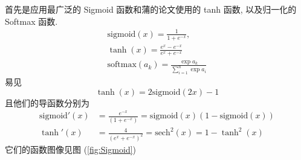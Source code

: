 \documentclass[lang=cn,a4paper,newtx]{elegantpaper}
\newcommand{\sech}{\text{sech}}
\begin{document}
首先是应用最广泛的 Sigmoid 函数和蒲的论文使用的 tanh 函数, 以及归一化的 Softmax 函数. 
\begin{equation}
    \begin{aligned}
        \text{sigmoid}(x) = \frac{1}{1+e^{-x}}, \\ 
        \tanh{(x)} = \frac{e^{x} - e^{-x}}{e^{x} + e^{-x}} \\
        \text{softmax}(a_k) = \frac{\exp a_k}{\sum_{i=1}^{n} \exp a_i}
    \end{aligned}
\end{equation} 
易见 
\begin{equation}
    \tanh(x) = 2 \text{sigmoid}(2x) - 1
\end{equation}
且他们的导函数分别为
\begin{align}\label{loss-example}
    \text{sigmoid}'(x) &= \frac{e^{-x}}{(1+e^{-x})} = \text{sigmoid}(x)(1-\text{sigmoid}(x)) \\
    \tanh '(x) &= \frac{4}{(e^x + e^{-x})^2} = \sech^{2}(x) = 1 - \tanh ^{2}(x)
\end{align}
它们的函数图像见图 (\ref{fig:Sigmoid})
\end{document}
